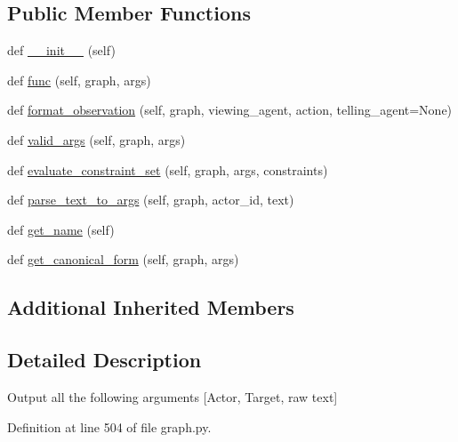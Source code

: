\subsection*{Public Member Functions}
\begin{DoxyCompactItemize}
\item 
def \hyperlink{classlight__chats_1_1graph_1_1TellFunction_ab0442ec224b9e0a627806d5634be2926}{\+\_\+\+\_\+init\+\_\+\+\_\+} (self)
\item 
def \hyperlink{classlight__chats_1_1graph_1_1TellFunction_a91e865e9bbba1f3ed3f01445896be21d}{func} (self, graph, args)
\item 
def \hyperlink{classlight__chats_1_1graph_1_1TellFunction_ab4c8496d4fa9e03040b6090eaa65528a}{format\+\_\+observation} (self, graph, viewing\+\_\+agent, action, telling\+\_\+agent=None)
\item 
def \hyperlink{classlight__chats_1_1graph_1_1TellFunction_a86e8534217b3d10cb4daf5cc080d624e}{valid\+\_\+args} (self, graph, args)
\item 
def \hyperlink{classlight__chats_1_1graph_1_1TellFunction_ad70758fa554b68e7b2517704a7ab5e76}{evaluate\+\_\+constraint\+\_\+set} (self, graph, args, constraints)
\item 
def \hyperlink{classlight__chats_1_1graph_1_1TellFunction_a88ac4115a6cca664cd220fb0b8852629}{parse\+\_\+text\+\_\+to\+\_\+args} (self, graph, actor\+\_\+id, text)
\item 
def \hyperlink{classlight__chats_1_1graph_1_1TellFunction_a39a099e864d0d20f997c03d96d7e1df8}{get\+\_\+name} (self)
\item 
def \hyperlink{classlight__chats_1_1graph_1_1TellFunction_a1ce8fd5a8ee86a01e68e9115f8cc9108}{get\+\_\+canonical\+\_\+form} (self, graph, args)
\end{DoxyCompactItemize}
\subsection*{Additional Inherited Members}


\subsection{Detailed Description}
\begin{DoxyVerb}Output all the following arguments [Actor, Target, raw text]\end{DoxyVerb}
 

Definition at line 504 of file graph.\+py.



